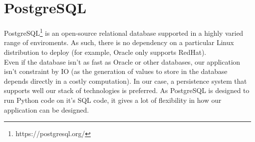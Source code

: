 \section{PostgreSQL}

PostgreSQL\footnote{https://postgresql.org/} is an open-source relational
database supported in a highly varied range of enviroments. As such, there is no
dependency on a particular Linux distribution to deploy (for example, Oracle only
supports RedHat).\\

Even if the database isn't as fast as Oracle or other databases, our
application isn't constraint by IO (as the generation of values to store in the
database depends directly in a costly computation). In our case, a persistence
system that supports well our stack of technologies is preferred. As
PostgreSQL is designed to run Python code on it's SQL code, it gives a lot
of flexibility in how our application can be designed.
